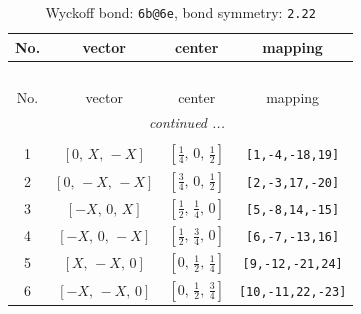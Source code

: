 \documentclass[fleqn,8pt]{jsarticle}
\begin{document}
\renewcommand{\arraystretch}{1.2}
\begin{longtable}{cccc}
\caption{Wyckoff bond: {\tt 6b@6e}, bond symmetry: {\tt 2.22}}
 \\
 \hline \hline
No. & vector & center & mapping \\ \hline \endfirsthead

\multicolumn{3}{l}{\tablename\ \thetable{}} \\
 \hline \hline
No. & vector & center & mapping \\ \hline \endhead

 \hline \hline
\multicolumn{3}{r}{\footnotesize\it continued ...} \\ \endfoot

 \hline \hline
\multicolumn{3}{r}{} \\ \endlastfoot

1 & $\left[ 0,\, X,\, - X \right]$ & $\left[ \frac{1}{4},\, 0,\, \frac{1}{2} \right]$ & {\tt [1,-4,-18,19]} \\ \hline
2 & $\left[ 0,\, - X,\, - X \right]$ & $\left[ \frac{3}{4},\, 0,\, \frac{1}{2} \right]$ & {\tt [2,-3,17,-20]} \\ \hline
3 & $\left[ - X,\, 0,\, X \right]$ & $\left[ \frac{1}{2},\, \frac{1}{4},\, 0 \right]$ & {\tt [5,-8,14,-15]} \\ \hline
4 & $\left[ - X,\, 0,\, - X \right]$ & $\left[ \frac{1}{2},\, \frac{3}{4},\, 0 \right]$ & {\tt [6,-7,-13,16]} \\ \hline
5 & $\left[ X,\, - X,\, 0 \right]$ & $\left[ 0,\, \frac{1}{2},\, \frac{1}{4} \right]$ & {\tt [9,-12,-21,24]} \\ \hline
6 & $\left[ - X,\, - X,\, 0 \right]$ & $\left[ 0,\, \frac{1}{2},\, \frac{3}{4} \right]$ & {\tt [10,-11,22,-23]} \\
\end{longtable}
\renewcommand{\arraystretch}{1.2}
\end{document}

